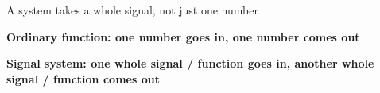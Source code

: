 \documentclass[aspectratio=169,11pt]{beamer}
\newcommand{\CardTitleSize}{\large}
\newcommand{\CardTitle}[1]{%
  \vspace{0.15cm}
  {\CardTitleSize\bfseries #1}\par
}
\begin{document}
\begin{frame}{A system takes a whole signal, not just one number}

\vspace{0.02cm}

\begin{OrangeCard}[
  width=\textwidth,
  halign=center,
  top=10pt,
  bottom=10pt
]
\CardTitle{Ordinary function: one number goes in, one number comes out}









\end{OrangeCard}

\vspace{0.14cm}

\begin{BlueCard}[
  width=\textwidth,
  halign=center,
  top=10pt,
  bottom=10pt
]
\CardTitle{Signal system: one whole signal / function goes in, another whole signal / function comes out}

\vspace{0.16cm}


\end{BlueCard}
\end{frame}
\end{document}
